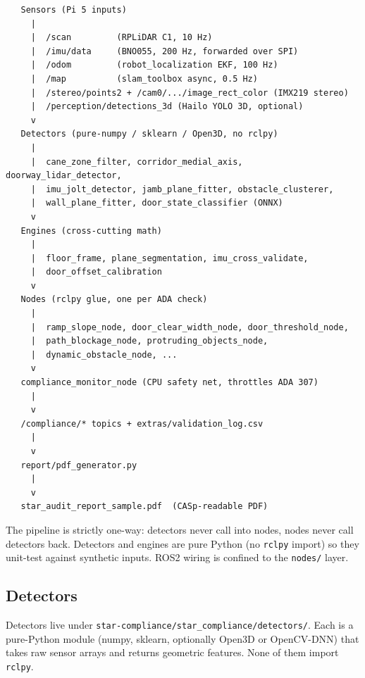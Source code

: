 \begin{center}
\begin{verbatim}
   Sensors (Pi 5 inputs)
     |
     |  /scan         (RPLiDAR C1, 10 Hz)
     |  /imu/data     (BNO055, 200 Hz, forwarded over SPI)
     |  /odom         (robot_localization EKF, 100 Hz)
     |  /map          (slam_toolbox async, 0.5 Hz)
     |  /stereo/points2 + /cam0/.../image_rect_color (IMX219 stereo)
     |  /perception/detections_3d (Hailo YOLO 3D, optional)
     v
   Detectors (pure-numpy / sklearn / Open3D, no rclpy)
     |
     |  cane_zone_filter, corridor_medial_axis, doorway_lidar_detector,
     |  imu_jolt_detector, jamb_plane_fitter, obstacle_clusterer,
     |  wall_plane_fitter, door_state_classifier (ONNX)
     v
   Engines (cross-cutting math)
     |
     |  floor_frame, plane_segmentation, imu_cross_validate,
     |  door_offset_calibration
     v
   Nodes (rclpy glue, one per ADA check)
     |
     |  ramp_slope_node, door_clear_width_node, door_threshold_node,
     |  path_blockage_node, protruding_objects_node,
     |  dynamic_obstacle_node, ...
     v
   compliance_monitor_node (CPU safety net, throttles ADA 307)
     |
     v
   /compliance/* topics + extras/validation_log.csv
     |
     v
   report/pdf_generator.py
     |
     v
   star_audit_report_sample.pdf  (CASp-readable PDF)
\end{verbatim}
\end{center}

The pipeline is strictly one-way: detectors never call into nodes,
nodes never call detectors back. Detectors and engines are pure Python
(no \texttt{rclpy} import) so they unit-test against synthetic inputs.
ROS2 wiring is confined to the \texttt{nodes/} layer.

\subsection{Detectors}

Detectors live under \texttt{star-compliance/star\_compliance/detectors/}.
Each is a pure-Python module (numpy, sklearn, optionally Open3D or
OpenCV-DNN) that takes raw sensor arrays and returns geometric
features. None of them import \texttt{rclpy}.

